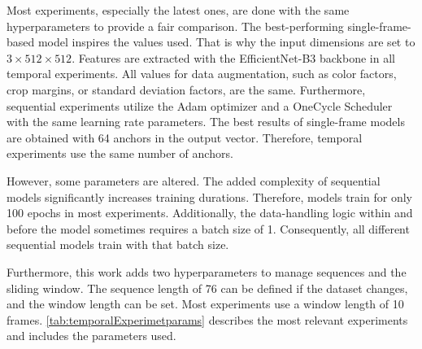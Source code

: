 Most experiments, especially the latest ones, are done with the same hyperparameters to provide a fair comparison.
The best-performing single-frame-based model inspires the values used.
That is why the input dimensions are set to $3 \times 512 \times 512$.
Features are extracted with the EfficientNet-B3 backbone in all temporal experiments.
All values for data augmentation, such as color factors, crop margins, or standard deviation factors, are the same.
Furthermore, sequential experiments utilize the Adam optimizer \cite{pytorchAdamOptimizer} and a OneCycle Scheduler \cite{pytorch_oneCycleLR_docu} with the same learning rate parameters.
The best results of single-frame models are obtained with 64 anchors in the output vector.
Therefore, temporal experiments use the same number of anchors.

However, some parameters are altered.
The added complexity of sequential models significantly increases training durations.
Therefore, models train for only 100 epochs in most experiments.
Additionally, the data-handling logic within and before the model sometimes requires a batch size of 1.
Consequently, all different sequential models train with that batch size.

Furthermore, this work adds two hyperparameters to manage sequences and the sliding window.
The sequence length of 76 can be defined if the dataset changes, and the window length can be set.
Most experiments use a window length of 10 frames.
\autoref{tab:temporalExperimetparams} describes the most relevant experiments and includes the parameters used.

\vspace{1cm}

